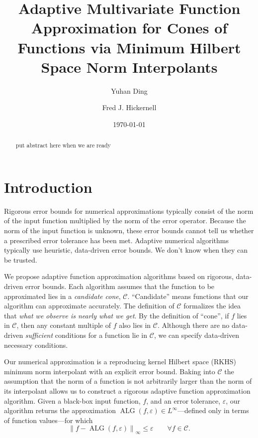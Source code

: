 \documentclass[]{mcom-l}
\title[Adaptive Multivariate Function Approximation]{Adaptive Multivariate Function Approximation for Cones of Functions via Minimum Hilbert Space Norm Interpolants}
\author{Yuhan Ding}
\author{Fred J. Hickernell}
\date{\today}
\theoremstyle{plain}
\theoremstyle{definition}
\DeclareMathOperator{\ALG}{ALG}
\newcommand{\cc}{\mathcal{C}}
\newcommand{\calc}{{\mathcal{C}}}
\newcommand{\norm}[2][{}]{\ensuremath{\left \lVert #2 \right \rVert}_{#1}}
\begin{document}
\maketitle

\begin{abstract}
    put abstract here when we are ready
\end{abstract}


\section{Introduction}
Rigorous error bounds for numerical approximations typically consist of the norm of the input function multiplied by the norm of the error operator.  Because the norm of the input function is unknown, these error bounds cannot tell us whether a prescribed error tolerance has been met.  Adaptive numerical algorithms typically use heuristic, data-driven error bounds.  We don't know when they can be trusted.

We propose  adaptive function approximation algorithms based on rigorous, data-driven error bounds.  Each algorithm assumes that the function to be approximated lies in a \emph{candidate cone}, $\cc$.  ``Candidate'' means functions that our algorithm can approximate accurately.  The definition of $\cc$ formalizes the idea that \emph{what we observe is nearly what we get}.  By the definition of ``cone'', if $f$ lies in $\cc$, then any constant multiple of $f$  also lies in $\cc$.  Although there are no data-driven \emph{sufficient} conditions for a function lie in $\calc$, we can specify data-driven necessary conditions.

Our numerical approximation is a reproducing kernel Hilbert space (RKHS) minimum norm interpolant with an explicit error bound.  Baking into $\cc$ the assumption that the norm of a function is not arbitrarily larger than the norm of its interpolant allows us to construct a rigorous adaptive function approximation algorithm. Given a black-box input function, $f$, and an error tolerance, $\varepsilon$, our algorithm returns the approximation $\ALG(f,\varepsilon) \in L^\infty$---defined only in terms of function values---for which 
\begin{equation} \label{eq:errorcrit}
\norm[\infty]{f - \ALG(f,\varepsilon)} \le \varepsilon \qquad \forall f\in \cc.
\end{equation}
\end{document}
